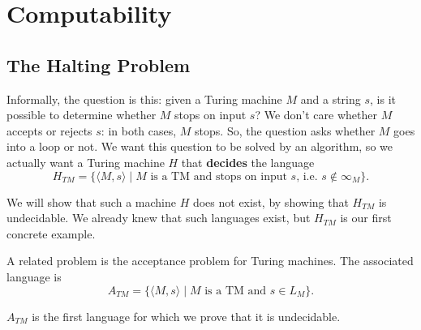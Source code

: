 \chapter{Computability}

\section{The Halting Problem}\label{halting}

Informally, the question is this: given a Turing machine $M$ and a
string $s$, is it possible to determine whether $M$ stops on input $s$?
We don't care whether $M$ accepts or rejects $s$: in both cases, $M$ stops.
So, the question asks whether $M$ goes into a loop or not. We want this
question to be solved by an algorithm, so we actually want a
Turing machine $H$ that {\bf decides} the language
\begin{equation*}
	H_{TM} = \{\langle M,s \rangle \mid \text{$M$ is a TM and stops on input $s$, i.e. $s\notin\infty_M$}\}.
\end{equation*}

We will show that such a machine $H$ does not exist, by showing that $H_{TM}$ is
undecidable. We already knew that such languages exist, but $H_{TM}$ is our
first concrete example.

A related problem is the acceptance problem for Turing machines. The associated language is
\begin{equation*}
A_{TM} = \{\langle M,s \rangle \mid \text{$M$ is a TM and $s\in L_M$}\}.
\end{equation*}

$A_{TM}$ is the first language for which we prove that it is undecidable.  %

